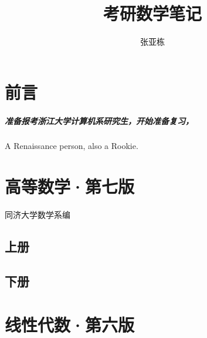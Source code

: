 \documentclass[12pt, twoside, a4paper]{book}
\begin{document}
\begin{CJK}{UTF8}{gbsn}
\frontmatter
\title{考研数学笔记}
\author{张亚栋}
\maketitle

\renewcommand{\contentsname}{目录}
\tableofcontents 

\chapter{前言}
	\paragraph{准备报考浙江大学计算机系研究生，开始准备复习，}
	\centering A Renaissance person, also a Rookie.
\chapter{高等数学·第七版}
同济大学数学系编
	\section*{上册}
	\section*{下册}

\chapter{线性代数·第六版}

\mainmatter
\chapter*{}

\backmatter
\end{CJK}
\end{document}

